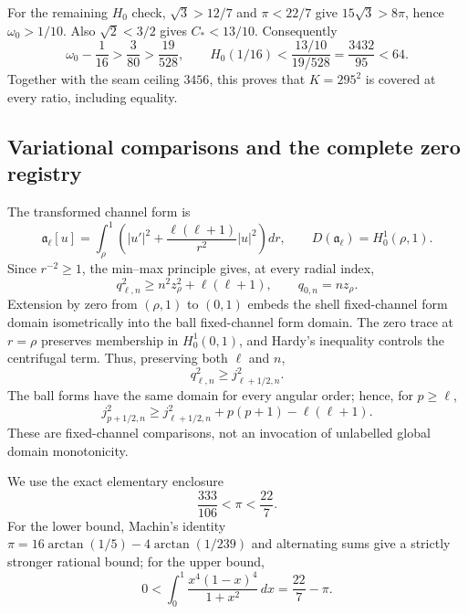 \documentclass[11pt]{article}
\numberwithin{equation}{section}
\theoremstyle{definition}
\theoremstyle{remark}
\begin{document}
For the remaining \(H_0\) check, \(\sqrt3>12/7\) and \(\pi<22/7\)
give \(15\sqrt3>8\pi\), hence \(\omega_0>1/10\).  Also
\(\sqrt2<3/2\) gives \(C_*<13/10\).  Consequently
\[
 \omega_0-\frac1{16}>\frac3{80}>\frac{19}{528},
 \qquad
 H_0(1/16)<\frac{13/10}{19/528}
 =\frac{3432}{95}<64.
\]
Together with the seam ceiling \(3456\), this proves that
\(K=295^2\) is covered at every ratio, including equality.

\subsection{Variational comparisons and the complete zero registry}

The transformed channel form is
\[
 \mathfrak a_\ell[u]=\int_\rho^1
 \left(|u'|^2+\frac{\ell(\ell+1)}{r^2}|u|^2\right)dr,
 \qquad D(\mathfrak a_\ell)=H_0^1(\rho,1).
\]
Since \(r^{-2}\geq1\), the min--max principle gives, at every radial
index,
\begin{equation}
 q_{\ell,n}^2\geq n^2z_\rho^2+\ell(\ell+1),
 \qquad q_{0,n}=nz_\rho.
 \label{cm:eq-product-bound}
\end{equation}
Extension by zero from \((\rho,1)\) to \((0,1)\) embeds the shell
fixed-channel form domain isometrically into the ball fixed-channel form
domain.  The zero trace at \(r=\rho\) preserves membership in
\(H_0^1(0,1)\), and Hardy's inequality controls the centrifugal term.
Thus, preserving both \(\ell\) and \(n\),
\begin{equation}
 q_{\ell,n}^2\geq j_{\ell+1/2,n}^2.
 \label{cm:eq-shell-ball}
\end{equation}
The ball forms have the same domain for every angular order; hence, for
\(p\geq\ell\),
\begin{equation}
 j_{p+1/2,n}^2\geq j_{\ell+1/2,n}^2
 +p(p+1)-\ell(\ell+1).
 \label{cm:eq-angular-propagation}
\end{equation}
These are fixed-channel comparisons, not an invocation of unlabelled
global domain monotonicity.

We use the exact elementary enclosure
\begin{equation}
 \frac{333}{106}<\pi<\frac{22}{7}.
 \label{cm:eq-pi}
\end{equation}
For the lower bound, Machin's identity
\(\pi=16\arctan(1/5)-4\arctan(1/239)\) and alternating sums give a
strictly stronger rational bound; for the upper bound,
\[
 0<\int_0^1\frac{x^4(1-x)^4}{1+x^2}\,dx=\frac{22}{7}-\pi.
\]
\end{document}
